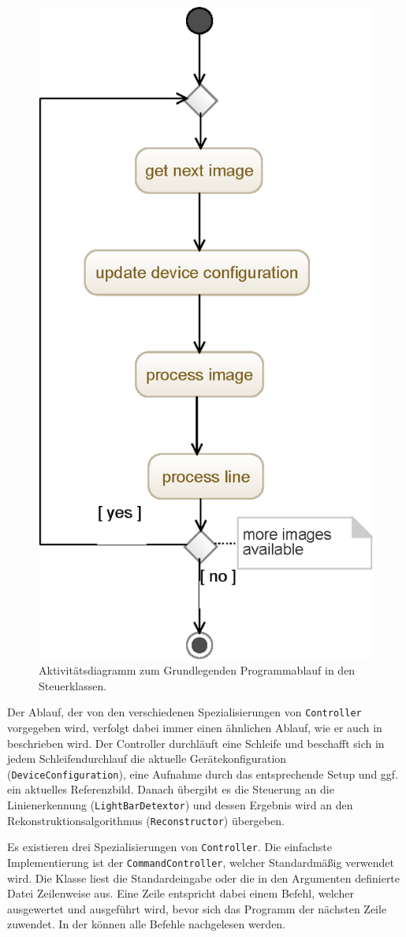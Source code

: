 \documentclass[ngerman,a4paper,parskip=half]{scrartcl}
\begin{document}
\begin{figure}
	\centering
	\includegraphics[width=0.4\linewidth]{includes/software_controller}
	\caption{Aktivitätsdiagramm zum Grundlegenden Programmablauf in den Steuerklassen.}
	\label{fig:software_controller}
\end{figure}

Der Ablauf, der von den verschiedenen Spezialisierungen von \texttt{Controller} vorgegeben wird, verfolgt dabei immer einen ähnlichen Ablauf, wie er auch in  beschrieben wird. Der Controller durchläuft eine Schleife und beschafft sich in jedem Schleifendurchlauf die aktuelle Gerätekonfiguration (\texttt{DeviceConfiguration}), eine Aufnahme durch das entsprechende Setup und ggf. ein aktuelles Referenzbild. Danach übergibt es die Steuerung an die Linienerkennung (\texttt{LightBarDetextor}) und dessen Ergebnis wird an den Rekonstruktionsalgorithmus (\texttt{Reconstructor}) übergeben.

Es existieren drei Spezialisierungen von \texttt{Controller}. Die einfachste Implementierung ist der \texttt{CommandController}, welcher Standardmäßig verwendet wird. Die Klasse liest die Standardeingabe oder die in den Argumenten definierte Datei Zeilenweise aus. Eine Zeile entspricht dabei einem Befehl, welcher ausgewertet und ausgeführt wird, bevor sich das Programm der nächsten Zeile zuwendet. In der  können alle Befehle nachgelesen werden.
\end{document}
